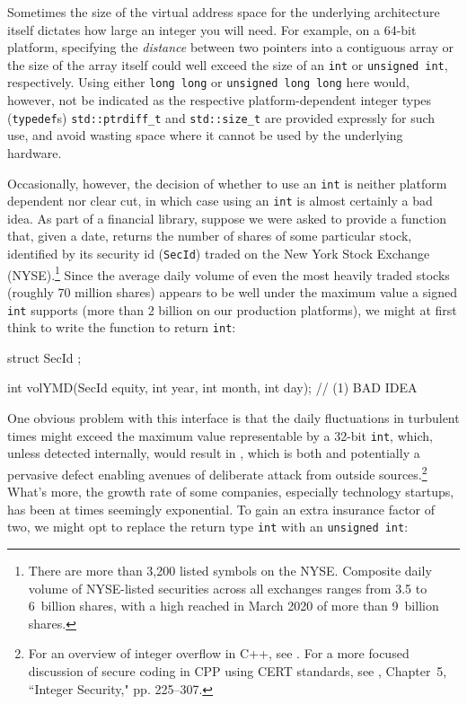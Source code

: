 Sometimes the size of the virtual address space for the
underlying architecture itself dictates how large an integer you will
need. For example, on a 64-bit platform, specifying the \emph{distance} between two pointers
into a contiguous array or the size of the array itself could well exceed the size of an \lstinline!int! or
\lstinline!unsigned!~\lstinline!int!, respectively. Using either
\lstinline!long!~\lstinline!long! or
\lstinline!unsigned!~\lstinline!long!~\lstinline!long! here would, however, not
be indicated as the respective platform-dependent integer types
(\lstinline!typedef!s) \lstinline!std::ptrdiff_t! and \lstinline!std::size_t!
are provided expressly for such use, and avoid wasting space where it
cannot be used by the underlying hardware.

Occasionally, however, the decision of whether to use an \lstinline!int! is
neither platform dependent nor clear cut, in which case using an
\lstinline!int! is almost certainly a bad idea. As part of a financial
library, suppose we were asked to provide a function that, given a date,
returns the number of shares of some particular stock, identified by its
security id (\lstinline!SecId!) traded on the New York Stock Exchange
(NYSE).\footnote{There are more than 3,200 listed symbols on the NYSE. Composite daily volume of NYSE-listed securities across all exchanges  ranges from 3.5 to 6~billion shares, with a high reached in March 2020 of more than 9~billion shares.} Since the average daily volume of even the most heavily traded stocks (roughly 70 million shares) appears to
be well under the maximum value a signed \lstinline!int! supports (more
than 2 billion on our production platforms), we might at first think to write the function
to return \lstinline!int!:

\begin{emcppshiddenlisting}[emcppsbatch={e1,e2,e3,e4,e5,e6}]
struct SecId {};
\end{emcppshiddenlisting}
\begin{emcppslisting}[emcppsbatch=e1]
int volYMD(SecId equity, int year, int month, int day);  // (1) BAD IDEA
\end{emcppslisting}

\noindent One obvious problem with this interface is that the daily fluctuations
in turbulent times might exceed the maximum value representable by a
32-bit \lstinline!int!, which, unless detected internally, would result in
, which is both  and potentially a pervasive defect enabling avenues of deliberate attack from outside sources.{\cprotect\footnote{For an overview of integer overflow in C++, see \cite{ballman}. For a more focused discussion of secure coding in CPP using CERT standards, see \cite{seacord13}, Chapter~5, ``Integer Security," pp. 225--307.}} What's more, the growth rate of some companies,
especially technology startups, has
been at times seemingly exponential. To gain an extra
insurance factor of two, we might opt to replace the return type
\lstinline!int! with an \lstinline!unsigned!~\lstinline!int!:

